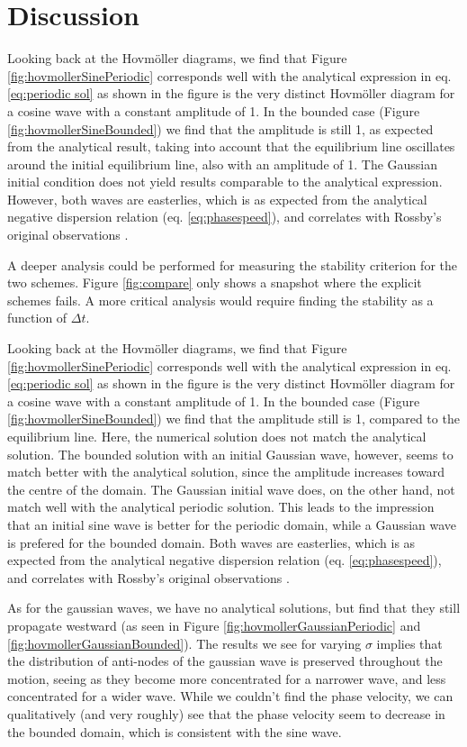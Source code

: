 \section{Discussion}
\label{sec:discussion}

Looking back at the Hovmöller diagrams, we find that Figure \ref{fig:hovmollerSinePeriodic} corresponds well with the analytical expression in eq. \ref{eq:periodic sol} as shown in the figure is the very distinct Hovmöller diagram for a cosine wave with a constant amplitude of 1. In the bounded case (Figure \ref{fig:hovmollerSineBounded}) we find that the amplitude is still 1, as expected from the analytical result, taking into account that the equilibrium line oscillates around the initial equilibrium line, also with an amplitude of 1. The Gaussian initial condition does not yield results comparable to the analytical expression. However, both waves are easterlies, which is as expected from the analytical negative dispersion relation (eq. \ref{eq:phasespeed}), and correlates with Rossby's original observations \citep{rossby}. 

A deeper analysis could be performed for measuring the stability criterion for the two schemes. Figure \ref{fig:compare} only shows a snapshot where the explicit schemes fails. A more critical analysis would require finding the stability as a function of $\Delta t$.

Looking back at the Hovmöller diagrams, we find that Figure \ref{fig:hovmollerSinePeriodic} corresponds well with the analytical expression in eq. \ref{eq:periodic sol} as shown in the figure is the very distinct Hovmöller diagram for a cosine wave with a constant amplitude of 1. In the bounded case (Figure \ref{fig:hovmollerSineBounded}) we find that the amplitude still is 1, compared to the equilibrium line. Here, the numerical solution does not match the analytical solution. The bounded solution with an initial Gaussian wave, however, seems to match better with the analytical solution, since the amplitude increases toward the centre of the domain. The Gaussian initial wave does, on the other hand, not match well with the analytical periodic solution. This leads to the impression that an initial sine wave is better for the periodic domain, while a Gaussian wave is prefered for the bounded domain. Both waves are easterlies, which is as expected from the analytical negative dispersion relation (eq. \ref{eq:phasespeed}), and correlates with Rossby's original observations \citep{rossby}.

As for the gaussian waves, we have no analytical solutions, but find that they still propagate westward (as seen in Figure \ref{fig:hovmollerGaussianPeriodic} and \ref{fig:hovmollerGaussianBounded}). The results we see for varying $\sigma$ implies that the distribution of anti-nodes of the gaussian wave is preserved throughout the motion, seeing as they become more concentrated for a narrower wave, and less concentrated for a wider wave. While we couldn't find the phase velocity, we can qualitatively (and very roughly) see that the phase velocity seem to decrease in the bounded domain, which is consistent with the sine wave.

